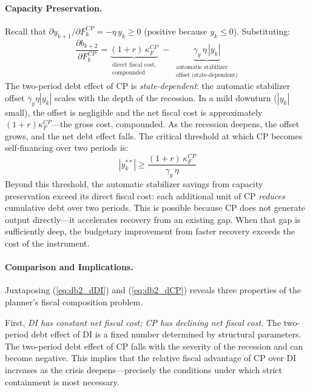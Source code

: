 \documentclass[12pt, a4paper]{article}
\begin{document}
\paragraph{Capacity Preservation.}

Recall that $\partial y_{k+1} / \partial F_k^{CP} = -\eta \, y_k \geq 0$
(positive because $y_k \leq 0$). Substituting:
%
\begin{equation}
    \frac{\partial b_{k+2}}{\partial F_k^{CP}}
      = \underbrace{(1+r) \, \kappa_F^{CP}}_{\substack{\text{direct fiscal cost,} \\ \text{compounded}}}
      \;-\; \underbrace{\gamma_y \, \eta \, |y_k|}_{\substack{\text{automatic stabilizer} \\ \text{offset (state-dependent)}}}
    \label{eq:db2_dCP}
\end{equation}
%
The two-period debt effect of CP is \textit{state-dependent}: the automatic
stabilizer offset $\gamma_y \eta |y_k|$ scales with the depth of the recession.
In a mild downturn ($|y_k|$ small), the offset is negligible and the net fiscal
cost is approximately $(1+r) \kappa_F^{CP}$---the gross cost, compounded. As the
recession deepens, the offset grows, and the net debt effect falls. The
critical threshold at which CP becomes self-financing over two periods is:
%
\begin{equation}
    |y_k^{**}| \geq \frac{(1+r) \, \kappa_F^{CP}}{\gamma_y \, \eta}
    \label{eq:CP_self_financing}
\end{equation}
%
Beyond this threshold, the automatic stabilizer savings from capacity
preservation exceed its direct fiscal cost: each additional unit of CP
\textit{reduces} cumulative debt over two periods. This is possible because CP
does not generate output directly---it accelerates recovery from an existing
gap. When that gap is sufficiently deep, the budgetary improvement from faster
recovery exceeds the cost of the instrument.

\paragraph{Comparison and Implications.}

Juxtaposing (\ref{eq:db2_dDI}) and (\ref{eq:db2_dCP}) reveals three properties
of the planner's fiscal composition problem.

First, \textit{DI has constant net fiscal cost; CP has declining net fiscal
cost.} The two-period debt effect of DI is a fixed number determined by
structural parameters. The two-period debt effect of CP falls with the severity
of the recession and can become negative. This implies that the relative fiscal
advantage of CP over DI increases as the crisis deepens---precisely the
conditions under which strict containment is most necessary.
\end{document}
